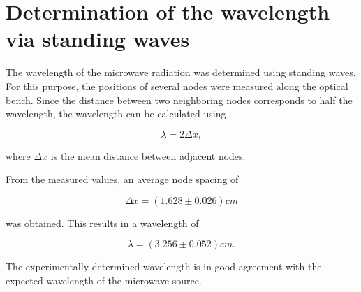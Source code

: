 \section{Determination of the wavelength via standing waves}
\noindent
\setlength{\parindent}{0pt}

The wavelength of the microwave radiation was determined using standing waves. For this purpose, 
the positions of several nodes were measured along the optical bench. Since the distance between 
two neighboring nodes corresponds to half the wavelength, the wavelength can be calculated using

\begin{equation}
    \lambda = 2 {\Delta x},
\end{equation}

where ${\Delta x}$ is the mean distance between adjacent nodes.

From the measured values, an average node spacing of

\begin{equation}
    {\Delta x}
    =
    (1.628 \pm 0.026)cm
\end{equation}

was obtained. This results in a wavelength of

\begin{equation}
    \lambda
    =
    (3.256 \pm 0.052) cm.
\end{equation}

The experimentally determined wavelength is in good agreement with the expected wavelength of 
the microwave source.

